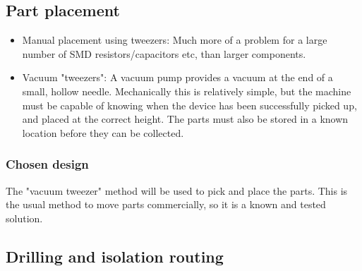 \subsection{Part placement}

\begin{itemize}
	\item	Manual placement using tweezers: Much more of a problem for a large number of SMD resistors/capacitors etc, than
		larger components. 
	\item	Vacuum "tweezers": A vacuum pump provides a vacuum at the end of a small, hollow needle. Mechanically this is relatively simple, but the machine must be capable
			of knowing when the device has been successfully picked up, and placed at the correct height. The parts must also be stored in a known location before they can be
			collected.
\end{itemize}

\subsubsection{Chosen design}
The "vacuum tweezer" method will be used to pick and place the parts. This is the usual method to move parts commercially, so it is a known and tested solution.



\subsection{Drilling and isolation routing}


